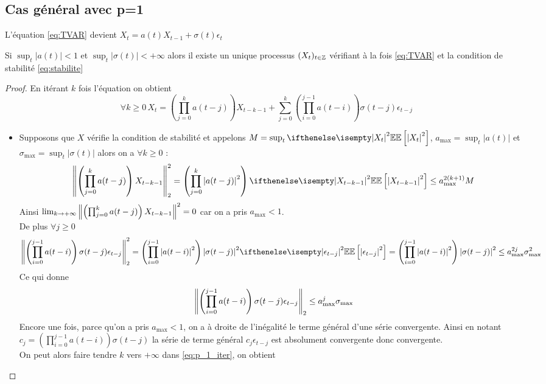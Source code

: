 \documentclass[a4paper,french]{article}
\begin{document}
\subsection{Cas général avec p=1}
L'équation \eqref{eq:TVAR} devient $X_t = a(t)X_{t-1} + \sigma(t) \epsilon_t$
\begin{Prop}
Si $\sup_t |a(t)| < 1$ et $\sup_t |\sigma(t)| < +\infty$ alors il existe un unique processus $(X_t)_{t \in \mathbb{Z}}$ vérifiant à la fois \eqref{eq:TVAR} et la condition de stabilité \eqref{eq:stabilite}
\end{Prop}
\begin{proof}
En itérant $k$ fois l'équation on obtient 
\begin{equation}\label{eq:p_1_iter} 
\forall k \geq 0 \, X_t = \left( \prod_{j=0}^{k} a(t-j)  \right) X_{t-k-1} + \sum_{j=0}^k \left( \prod_{i=0}^{j-1} a(t-i) \right) \sigma(t-j)\epsilon_{t-j}
\end{equation}
\begin{itemize}
\item Supposons que $X$ vérifie la condition de stabilité et appelons $M = \sup_t \EE[\abs{X_t}^2]$, $a_{\max} = \sup_t |a(t)|$ et $\sigma_{\max} = \sup_t |\sigma(t)|$ alors on a $\forall k \geq 0$ :
\[
\norm{\left( \prod_{j=0}^{k} a(t-j)  \right) X_{t-k-1} }_2^2 = \left( \prod_{j=0}^{k} \abs{a(t-j)}^2 \right) \EE[\abs{X_{t-k-1}}^2] \leq a_{\max}^{2(k+1)} M
\]
Ainsi $\lim_{k \rightarrow +\infty} { \left\| \left( \prod_{j=0}^{k} a(t-j)  \right) X_{t-k-1}  \right\|}^2 = 0$ car on a pris $a_{\max} < 1$.\\ 
De plus $\forall j \geq 0$
\begin{equation}\label{eq:p_1_sommabilite}
\norm{\left( \prod_{i=0}^{j-1} a(t-i) \right) \sigma(t-j)\epsilon_{t-j}}_2^2 =  \left( \prod_{i=0}^{j-1} \abs{a(t-i)}^2 \right) \abs{\sigma(t-j)}^2 \EE[\abs{\epsilon_{t-j}}^2]
= \left( \prod_{i=0}^{j-1} \abs{a(t-i)}^2 \right) \abs{\sigma(t-j)}^2
\leq a_{\max}^{2j} \sigma_{\max}^2
\end{equation}
Ce qui donne 
\[
{ \left\| \left( \prod_{i=0}^{j-1} a(t-i) \right) \sigma(t-j)\epsilon_{t-j} \right\|}_2 \leq a_{\max}^{j} \sigma_{\max}
\]
Encore une fois, parce qu'on a pris $a_{\max}<1$, on a à droite de l'inégalité le terme général d'une série convergente. Ainsi en notant $c_j = \left( \prod_{i=0}^{j-1} a(t-i) \right) \sigma(t-j)$ la série de terme général $c_j \epsilon_{t-j}$ est absolument convergente donc convergente. \\
On peut alors faire tendre $k$ vers $+\infty$ dans \eqref{eq:p_1_iter}, on obtient 
\begin{equation}\label{eq:p_1_solution}

\end{equation}
\end{itemize}
\end{proof}
\end{document}
